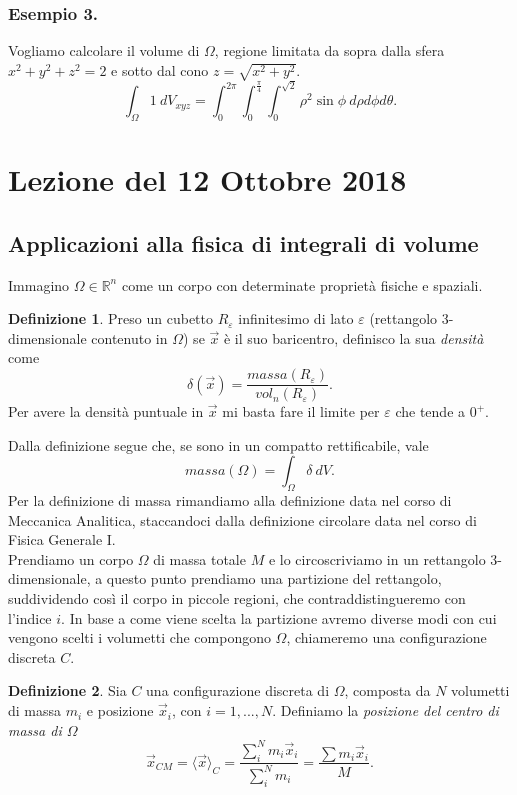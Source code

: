 \documentclass[10pt]{article}
\theoremstyle{plain}
\theoremstyle{definition}
\newtheorem{defn}{Definizione}
\begin{document}
\subsubsection{Esempio 3.}
Vogliamo calcolare il volume di $\Omega$, regione limitata da sopra dalla sfera $x^2+y^2+z^2=2$ e sotto dal cono $z=\sqrt{x^2+y^2}$.
$$\int_{\Omega} 1\ dV_{xyz} = \int_0^{2\pi} \int_0^{\frac{\pi}{4}} \int_0^{\sqrt{2}}  \rho^2 \sin{\phi} \ d\rho d\phi d\theta. $$

\section{Lezione del 12 Ottobre 2018}

\subsection{Applicazioni alla fisica di integrali di volume}
Immagino $\Omega \in \mathbb{R}^n$ come un corpo con determinate proprietà fisiche e spaziali.
\begin{defn}
Preso un cubetto $R_\varepsilon$ infinitesimo di lato $\varepsilon$ (rettangolo 3-dimensionale contenuto in $\Omega$) se $\vec{x}$ è il suo baricentro, definisco la sua \textit{densità} come
$$\delta(\vec{x})=\frac{massa(R_\varepsilon)}{vol_n(R_\varepsilon)}.$$ 
Per avere la densità puntuale in $\vec{x}$ mi basta fare il limite per $\varepsilon$ che tende a $0^+$.
\end{defn}
Dalla definizione segue che, se sono in un compatto rettificabile, vale
$$massa(\Omega)=\int_\Omega \delta \ dV. $$
Per la definizione di massa rimandiamo alla definizione data nel corso di Meccanica Analitica, staccandoci dalla definizione circolare data nel corso di Fisica Generale I.
\\ Prendiamo un corpo $\Omega$ di massa totale $M$ e lo circoscriviamo in un rettangolo 3-dimensionale, a questo punto prendiamo una partizione del rettangolo, suddividendo così il corpo in piccole regioni, che contraddistingueremo con l'indice $i$. In base a come viene scelta la partizione avremo diverse modi con cui vengono scelti i volumetti che compongono $\Omega$, chiameremo una configurazione discreta $C$.
\begin{defn}
Sia $C$ una configurazione discreta di $\Omega$, composta da $N$ volumetti di massa $m_i$ e posizione $\vec{x}_i$, con $i=1,...,N$. Definiamo la \textit{posizione del centro di massa di $\Omega$}
$$\vec{x}_{CM}=\langle \vec{x} \rangle_C = \frac{\sum_i^N m_i \vec{x} _i}{\sum_i^N m_i} = \frac{\sum m_i \vec{x} _i}{M}. $$
\end{defn}
\end{document}
